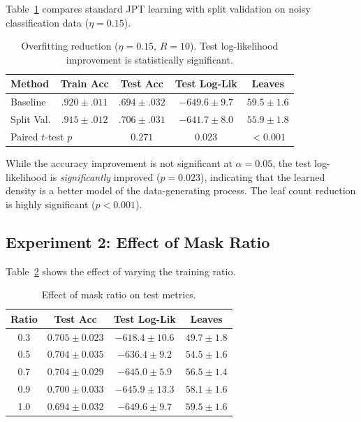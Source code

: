 \documentclass[11pt,a4paper]{article}
\begin{document}
Table~\ref{tab:exp1} compares standard JPT learning with split validation
on noisy classification data ($\eta = 0.15$).

\begin{table}[h]
\centering
\caption{Overfitting reduction ($\eta = 0.15$, $R = 10$). Test log-likelihood
         improvement is statistically significant.}
\label{tab:exp1}
\begin{tabular}{lcccc}
\toprule
Method & Train Acc & Test Acc & Test Log-Lik & Leaves \\
\midrule
Baseline   & $.920 \pm .011$ & $.694 \pm .032$ & $-649.6 \pm 9.7$ & $59.5 \pm 1.6$ \\
Split Val. & $.915 \pm .012$ & $.706 \pm .031$ & $\mathbf{-641.7 \pm 8.0}$ & $\mathbf{55.9 \pm 1.8}$ \\
\midrule
\multicolumn{2}{l}{Paired $t$-test $p$} & $0.271$ & $\mathbf{0.023}$ & $\mathbf{<0.001}$ \\
\bottomrule
\end{tabular}
\end{table}

While the accuracy improvement is not significant at $\alpha=0.05$, the test
log-likelihood is \emph{significantly} improved ($p = 0.023$), indicating that
the learned density is a better model of the data-generating process. The
leaf count reduction is highly significant ($p < 0.001$).

\subsection{Experiment 2: Effect of Mask Ratio}

Table~\ref{tab:exp2} shows the effect of varying the training ratio.

\begin{table}[h]
\centering
\caption{Effect of mask ratio on test metrics.}
\label{tab:exp2}
\begin{tabular}{cccc}
\toprule
Ratio & Test Acc & Test Log-Lik & Leaves \\
\midrule
0.3 & $0.705 \pm 0.023$ & $\mathbf{-618.4 \pm 10.6}$ & $\mathbf{49.7 \pm 1.8}$ \\
0.5 & $0.704 \pm 0.035$ & $-636.4 \pm 9.2$ & $54.5 \pm 1.6$ \\
0.7 & $0.704 \pm 0.029$ & $-645.0 \pm 5.9$ & $56.5 \pm 1.4$ \\
0.9 & $0.700 \pm 0.033$ & $-645.9 \pm 13.3$ & $58.1 \pm 1.6$ \\
1.0  & $0.694 \pm 0.032$ & $-649.6 \pm 9.7$ & $59.5 \pm 1.6$ \\
\bottomrule
\end{tabular}
\end{table}
\end{document}
